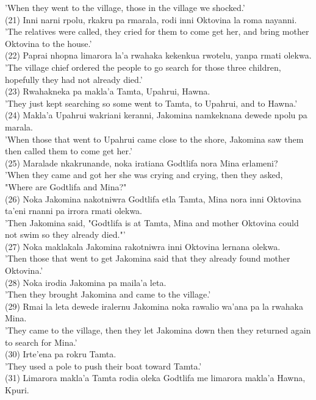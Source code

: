 \documentclass[10pt]{article}
\begin{document}
'When they went to the village, those in the village we shocked.'\\
(21) Inni narni rpolu, rkakru pa rmarala, rodi inni Oktovina la roma nayanni.\\
'The relatives were called, they cried for them to come get her, and bring mother Oktovina to the house.'\\
(22) Paprai nhopna limarora la'a rwahaka kekenkua rwotelu, yanpa rmati olekwa.\\
'The village chief ordered the people to go search for those three children, hopefully they had not already died.'\\
(23) Rwahakneka pa makla'a Tamta, Upahrui, Hawna.\\
'They just kept searching so some went to Tamta, to Upahrui, and to Hawna.'\\
(24) Makla’a Upahrui wakriani keranni, Jakomina namkeknana dewede npolu pa marala.\\
'When those that went to Upahrui came close to the shore, Jakomina saw them then called them to come get her.'\\
(25) Maralade nkakrunande, noka iratiana Godtlifa nora Mina erlameni?\\
'When they came and got her she was crying and crying, then they asked, "Where are Godtlifa and Mina?"\\
(26) Noka Jakomina nakotniwra Godtlifa etla Tamta, Mina nora inni Oktovina ta'eni rnanni pa irrora rmati olekwa.\\
'Then Jakomina said, "Godtlifa is at Tamta, Mina and mother Oktovina could not swim so they already died."'\\
(27) Noka maklakala Jakomina rakotniwra inni Oktovina lernana olekwa.\\
'Then those that went to get Jakomina said that they already found mother Oktovina.'\\
(28) Noka irodia Jakomina pa maila'a leta.\\
'Then they brought Jakomina and came to the village.'\\
(29) Rmai la leta dewede iralernu Jakomina noka rawalio wa'ana pa la rwahaka Mina.\\
'They came to the village, then they let Jakomina down then they returned again to search for Mina.'\\
(30) Irte'ena pa rokru Tamta.\\
'They used a pole to push their boat toward Tamta.'\\
(31) Limarora makla'a Tamta rodia oleka Godtlifa me limarora makla'a Hawna, Kpuri.\\
\end{document}
